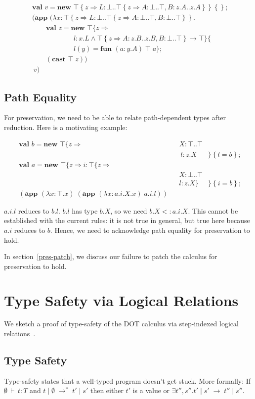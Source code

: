 \documentclass[9pt]{sigplanconf}
\newcommand{\gap}{\quad\quad}
\newcommand{\ts}{\,\vdash\,}
\newcommand{\typ}{:}
\newcommand{\reduces}{\;\rightarrow\;}
\newcommand{\tfun}{\rightarrow}
\newcommand{\tand}{\wedge}
\newcommand{\refine}[2]{\left\{#1 \Rightarrow #2 \right\}}
\newcommand{\mlrefine}[2]{\{#1 \Rightarrow #2 \}}
\newcommand{\ldefs}[1]{\left\{#1\right\}}
\newcommand{\mlldefs}[1]{\{#1\}}
\newcommand{\abs}[3]{\lambda #1\!:\!#2.#3}
\newcommand{\mlnew}[3]{\textbf{val }#1 = \textbf{new }#2 ;\;\\&#3}
\newcommand{\Ldecl}[3]{#1 : #2..#3}%
\newcommand{\ldecl}[2]{#1 : #2}
\newcommand{\mdecl}[3]{#1 : #2 \tfun #3}
\newcommand{\Top}{\top}%
\newcommand{\Bot}{\bot}%
\newcommand{\reduction}[4]{#1 \operatorname{|} #2 \reduces #3 \operatorname{|} #4}
\newcommand{\fun}[4]{\textbf{fun } (#1:#2)\;#3\;#4}
\newcommand{\app}[2]{(\textbf{app }#1\;#2)}
\newcommand{\mlapp}[2]{(\textbf{app }#1\;\\&#2)}
\newcommand{\cast}[2]{(\textbf{cast }#1\;#2)}
\newcommand{\reductionl}[5]{#1 \operatorname{|} #2 \;\rightarrow^{#5}\; #3 \operatorname{|} #4}
\begin{document}
\begin{align*}
&\mlnew v {\Top \refine z {\Ldecl L \Bot {\Top \refine z {\Ldecl A \Bot \Top, \Ldecl B {z.A} {z.A}}}} \ldefs{}}{
\mlapp {(\abs x {\Top \refine z {\Ldecl L \Bot {\Top \refine z {\Ldecl A \Bot \Top, \Ldecl B \Bot \Top}}}} {\\&\gap
\mlnew z {\Top \mlrefine z {\\&\gap\gap\gap
\mdecl l {x.L \tand {\Top \refine z {\Ldecl A {z.B} {z.B}, \Ldecl B \Bot \Top}}} \Top}\mlldefs{\\&\gap\gap\gap
l(y) = \fun a {y.A} \Top a}}{
\gap \cast {\top} z
}})}{\ v}}
\end{align*}

\subsection{Path Equality}\label{patheq}

For preservation, we need to be able to relate path-dependent types
after reduction. Here is a motivating example:

\begin{align*}
&\mlnew b {\Top \mlrefine z {&&\Ldecl X \Top \Top&\\
&&&\ \ldecl l {z.X}&}\ldefs{l = b}}{
\mlnew a {\Top \mlrefine z {\ldecl i {\Top \mlrefine z {&&&\\
&&&\Ldecl X \Bot \Top\\
&&&\ldecl l {z.X}}}&}\ldefs{i = b}}}{
\app {(\abs x \Top x)} {\app {(\abs x {a.i.X} x)} {a.i.l}}}
\end{align*}

$a.i.l$ reduces to $b.l$. $b.l$ has type $b.X$, so we need $b.X <:
a.i.X$. This cannot be established with the current rules: it is not
true in general, but true here because $a.i$ reduces to $b$. Hence,
we need to acknowledge path equality for preservation to hold.

In section~\ref{pres-patch}, we discuss our failure to patch the
calculus for preservation to hold.

\section{Type Safety via Logical Relations}\label{dot-type-safety}
We sketch a proof of type-safety of the DOT calculus via step-indexed
logical relations~\cite{ahmed04,ahmed06,step_indexed_obj}.

\subsection{Type Safety}
Type-safety states that a well-typed program doesn't get stuck. More
formally: If $\emptyset \ts t \typ T$ and $\reductionl t \emptyset {t'} {s'} *$ then
either $t'$ is a value or $\exists t'', s''. \reduction {t'} {s'}
{t''} {s''}$.
\end{document}
